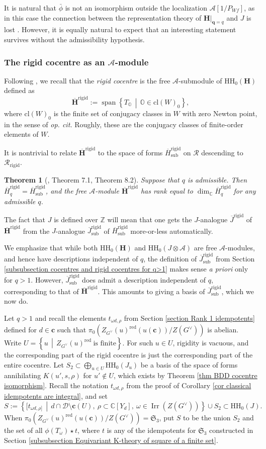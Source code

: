 \documentclass[10pt]{article}
\DeclareMathOperator{\spn}{span}
\newcommand{\sets}[2]{\left\{#1\,\middle|\,#2\right\}}
\DeclareMathOperator{\Irr}{Irr}
\newcommand{\HH}{\mathbf{H}}
\newcommand{\Z}{\mathbb{Z}}
\newcommand{\C}{\mathbb{C}}
\newcommand{\cc}{\mathbf{c}}
\newcommand{\Sn}{\mathfrak{S}}
\newcommand{\bq}{\mathbf{q}}
\newtheorem{theorem}{Theorem}
\theoremstyle{definition}
\theoremstyle{remark}
\newcommand{\Gd}{G^\vee}
\newcommand{\Hr}{\overline{\HH}^{\mathrm{rigid}}}
\newcommand{\Hrq}{\overline{H}^{\mathrm{rigid}}_q}
\newcommand{\Hrs}{\overline{H}^{\mathrm{rigid}}_{\mathrm{sub}}}
\newcommand{\Jr}{\overline{J}^{\mathrm{rigid}}}
\newcommand{\Jrs}{\overline{J}^{\mathrm{rigid}}_{\mathrm{sub}}}
\newcommand{\RH}{\mathcal{R}}
\newcommand{\RHr}{\mathcal{R}_{\mathrm{rigid}}}
\newcommand{\hhh}{\mathrm{HH}_0}
\newcommand{\Zur}{Z_{G^\vee}(u)^{\mathrm{red}}}
\newcommand{\oO}{\mathbb{O}}
\begin{document}
It is natural that $\bar{\phi}$ is not an isomorphism outside the localization
$\mathcal{A}[1/P_{Wf}]$, as in this case the connection between the representation theory of 
$\HH|_{\bq=q}$ and $J$ is lost \cite{XiJAMS}. However, it is equally natural to expect that an interesting
statement survives without the admissibility hypothesis. 
%
\subsubsection{The rigid cocentre as an $\mathcal{A}$-module}
%
Following \cite{CH}, we recall that the \emph{rigid cocentre} is the free $\mathcal{A}$-submodule
of $\hhh(\HH)$ defined as
\[
\Hr:=\spn{\sets{T_\oO}{\oO\in\mathrm{cl}(W)_0}},
\]
%
where $\mathrm{cl}(W)_0$ is the finite set of conjugacy classes in $W$ with zero Newton point, in the sense
of \textit{op. cit.} Roughly, these are the conjugacy classes of finite-order elements of $W$.

It is nontrivial to relate $\Hr$ to the space of forms $\Hrs$ on $\RH$ descending to $\RHr$. 
%
\begin{theorem}[\cite{CH}, Theorem 7.1, Theorem 8.2]
\label{thm CH separation}
Suppose that $q$ is admissible. Then $\Hrq=\Hrs$, and
the free $\mathcal{A}$-module $\Hr$ has rank equal to $\dim_\C\Hrq$ for any admissible $q$.
\end{theorem}
%
%
The fact that $J$ is defined 
over $\Z$ will mean that one gets the $J$-analogue $\Jr$ of $\Hr$ from the $J$-analogue
$\Jrs$ of $\Hrs$ more-or-less automatically. 

We emphasize that while both $\hhh(\HH)$ and $\hhh(J\otimes\mathcal{A})$ are free $\mathcal{A}$-modules,
and hence have descriptions independent of $q$, the definition of $\Jrs$
from Section \ref{subsubsection cocentres and rigid cocentres for q>1} makes sense \textit{a priori} 
only for $q>1$. However, $\Jrs$ does admit a description independent of $q$, corresponding to
that of $\Hr$. This amounts to giving a basis of $\Jrs$, which we now do.

Let $q>1$ and recall the elements $t_{\omega d,\rho}$ from Section \ref{section Rank 1 idempotents}  defined for $d\in\cc$ such that $\pi_0\left(\Zur(u(\cc))/Z(\Gd)\right)$ is abelian. Write $U=\sets{u}{\Zur~\text{is finite}}$. 
For such $u\in U$, rigidity is vacuous, and the corresponding part of the rigid cocentre is just the corresponding part of the entire cocentre. Let $S_2\subset\bigoplus_{u\in U} \hhh(J_u)$ be a basis of the space of forms annihilating $K(u',s,\rho)$ for $u'\not\in U$, which
exists by Theorem \ref{thm BDD cocentre isomorphism}. Recall the notation $t_{\omega d, \rho}$ from the proof of Corollary \ref{cor classical idempotents are integral}, and set
%
\[
S:=\sets{[t_{\omega d,\rho]}}{d\cap\mathcal{D}\setminus\cc(U),~\rho\subset\C[Y_d],~\omega\in\Irr(Z(G^\vee)) }\cup S_2\subset\hhh(J).
\]
%
When $\pi_0\left(\Zur(u(\cc))/Z(\Gd)\right)=\Sn_3$, put $S$ to be the union $S_2$ and the set of all $\phi(T_\omega)\star t$, where $t$ is any of the idempotents for $\Sn_3$ constructed in Section \ref{subsubsection Equivariant K-theory of square of a finite set}.
\end{document}
